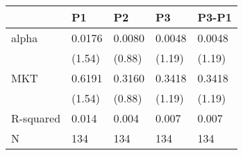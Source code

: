 \begin{tabular}{lllll}
\toprule
 & P1 & P2 & P3 & P3-P1 \\
\midrule
alpha & 0.0176 & 0.0080 & 0.0048 & 0.0048 \\
  & (1.54) & (0.88) & (1.19) & (1.19) \\
MKT & 0.6191 & 0.3160 & 0.3418 & 0.3418 \\
  & (1.54) & (0.88) & (1.19) & (1.19) \\
R-squared & 0.014 & 0.004 & 0.007 & 0.007 \\
N & 134 & 134 & 134 & 134 \\
\bottomrule
\end{tabular}
